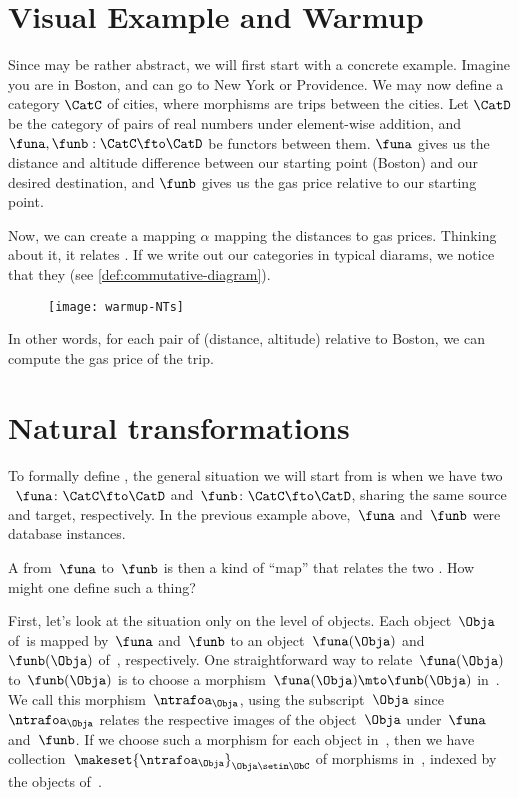 
\section{Visual Example and Warmup}
Since  may be rather abstract, we will first start with a concrete example. Imagine you are in Boston, and can go to New York or Providence. We may now define a category $\CatC$ of cities, where morphisms are trips between the cities. Let $\CatD$ be the category of pairs of real numbers under element-wise addition, and $\funa, \funb:\CatC\fto\CatD$ be functors between them. $\funa$ gives us the distance and altitude difference between our starting point (Boston) and our desired destination, and $\funb$ gives us the gas price relative to our starting point.

Now, we can create a mapping $\alpha$ mapping the distances to gas prices. Thinking about it, it relates . If we write out our categories in typical diarams, we notice that they  (see \cref{def:commutative-diagram}).

\begin{figure}[h]
    \texttt{[image: warmup-NTs]}
\end{figure}

In other words, for each pair of (distance, altitude) relative to Boston, we can compute the gas price of the trip. 

\section{Natural transformations}

To formally define , the general situation we will start from is when we have two ~$\funa \colon \CatC \fto \CatD$ and~$\funb \colon \CatC \fto \CatD$, sharing the same source and target, respectively.
In the previous example above,~$\funa$ and~$\funb$ were database instances.

A  from~$\funa$ to~$\funb$ is then a kind of ``map'' that relates the two .
How might one define such a thing?

First, let's look at the situation only on the level of objects.
Each object~$\Obja$ of~\CatC is mapped by~$\funa$ and~$\funb$ to an object~$\funa(\Obja)$ and~$\funb(\Obja)$ of~\CatD, respectively.
One straightforward way to relate~$\funa(\Obja)$ to~$\funb(\Obja)$ is to choose a morphism~$\funa(\Obja) \mto \funb(\Obja)$ in~\CatD.
We call this morphism~$\ntrafoa_{\Obja}$, using the subscript~$\Obja$ since~$\ntrafoa_{\Obja}$ relates the respective images of the object~$\Obja$ under~$\funa$ and~$\funb$.
If we choose such a morphism for each object in~\CatC, then we have collection~$\makeset{ \ntrafoa_\Obja }_{\Obja \setin \ObC}$ of morphisms in~\CatD, indexed by the objects of~\CatC.


